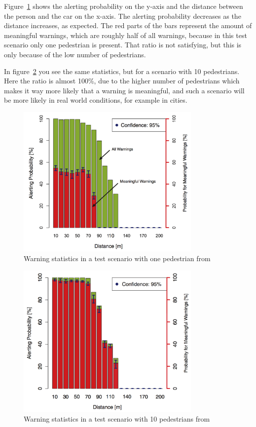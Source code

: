 \documentclass[]{ccs-thesis}
\begin{document}
Figure~\ref{fig:chart1} shows the alerting probability on the y-axis and the distance between the person and the car on the x-axis. The alerting probability decreases as the distance increases, as expected. The red parts of the bars represent the amount of meaningful warnings, which are roughly half of all warnings, because in this test scenario only one pedestrian is present. That ratio is not satisfying, but this is only because of the low number of pedestrians.

In figure~\ref{fig:chart2} you see the same statistics, but for a scenario with 10 pedestrians. Here the ratio is almost 100\%, due to the higher number of pedestrians which makes it way more likely that a warning is meaningful, and such a scenario will be more likely in real world conditions, for example in cities.

\begin{figure}[h]
	\centering
	\includegraphics[width=0.8\textwidth]{figures/2_chart}
	\caption{Warning statistics in a test scenario with one pedestrian from \cite{v2pprotection}}%
	\label{fig:chart1}%
\end{figure}

\begin{figure}[h]
	\centering
	\includegraphics[width=0.8\textwidth]{figures/3_chart}
	\caption{Warning statistics in a test scenario with 10 pedestrians from \cite{v2pprotection}}%
	\label{fig:chart2}%
\end{figure}
\end{document}
